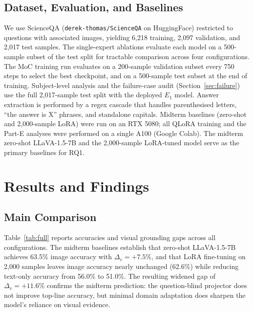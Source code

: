 \documentclass{article}
\begin{document}
\subsection{Dataset, Evaluation, and Baselines}

We use ScienceQA (\texttt{derek-thomas/ScienceQA} on HuggingFace) restricted to questions with associated images, yielding 6{,}218 training, 2{,}097 validation, and 2{,}017 test samples. The single-expert ablations evaluate each model on a 500-sample subset of the test split for tractable comparison across four configurations. The MoC training run evaluates on a 200-sample validation subset every 750 steps to select the best checkpoint, and on a 500-sample test subset at the end of training. Subject-level analysis and the failure-case audit (Section~\ref{sec:failure}) use the full 2{,}017-sample test split with the deployed $E_1$ model. Answer extraction is performed by a regex cascade that handles parenthesised letters, ``the answer is X'' phrases, and standalone capitals. Midterm baselines (zero-shot and 2{,}000-sample LoRA) were run on an RTX 5080; all QLoRA training and the Part-E analyses were performed on a single A100 (Google Colab). The midterm zero-shot LLaVA-1.5-7B and the 2{,}000-sample LoRA-tuned model serve as the primary baselines for RQ1.

\section{Results and Findings}

\subsection{Main Comparison}

Table~\ref{tab:full} reports accuracies and visual grounding gaps across all configurations. The midterm baselines establish that zero-shot LLaVA-1.5-7B achieves 63.5\% image accuracy with $\Delta_v = +7.5\%$, and that LoRA fine-tuning on 2{,}000 samples leaves image accuracy nearly unchanged (62.6\%) while reducing text-only accuracy from 56.0\% to 51.0\%. The resulting widened gap of $\Delta_v = +11.6\%$ confirms the midterm prediction: the question-blind projector does not improve top-line accuracy, but minimal domain adaptation does sharpen the model's reliance on visual evidence.
\end{document}
